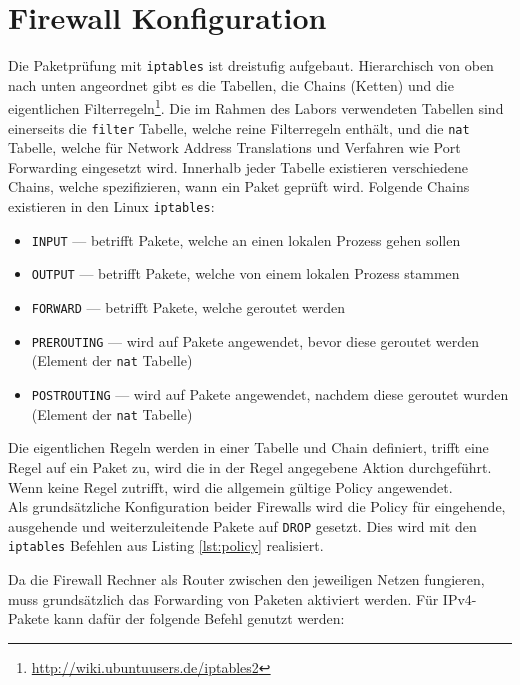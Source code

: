\section{Firewall Konfiguration}

Die Paketprüfung mit {\tt iptables} ist dreistufig aufgebaut.
Hierarchisch von oben nach unten angeordnet gibt es die Tabellen, die Chains
(Ketten) und die eigentlichen Filterregeln\footnote{
\url{http://wiki.ubuntuusers.de/iptables2}
}.
Die im Rahmen des Labors verwendeten Tabellen sind einerseits die {\tt filter}
Tabelle, welche reine Filterregeln enthält, und die {\tt nat} Tabelle, welche
für Network Address Translations und Verfahren wie Port Forwarding eingesetzt
wird.
Innerhalb jeder Tabelle existieren verschiedene Chains, welche spezifizieren,
wann ein Paket geprüft wird.
Folgende Chains existieren in den Linux {\tt iptables}:

\begin{itemize}
\item {\tt INPUT} --- betrifft Pakete, welche an einen lokalen Prozess gehen
      sollen
\item {\tt OUTPUT} --- betrifft Pakete, welche von einem lokalen Prozess stammen
\item {\tt FORWARD} --- betrifft Pakete, welche geroutet werden
\item {\tt PREROUTING} --- wird auf Pakete angewendet, bevor diese geroutet
      werden (Element der {\tt nat} Tabelle)
\item {\tt POSTROUTING} --- wird auf Pakete angewendet, nachdem diese geroutet
      wurden (Element der {\tt nat} Tabelle)
\end{itemize}

\noindent Die eigentlichen Regeln werden in einer Tabelle und Chain definiert,
trifft eine Regel auf ein Paket zu, wird die in der Regel angegebene Aktion
durchgeführt.
Wenn keine Regel zutrifft, wird die allgemein gültige Policy angewendet.
\\

\noindent Als grundsätzliche Konfiguration beider Firewalls wird die Policy für
eingehende, ausgehende und weiterzuleitende Pakete auf {\tt DROP} gesetzt.
Dies wird mit den {\tt iptables} Befehlen aus Listing \ref{lst:policy}
realisiert.



\noindent Da die Firewall Rechner als Router zwischen den jeweiligen Netzen
fungieren, muss grundsätzlich das Forwarding von Paketen aktiviert werden.
Für IPv4-Pakete kann dafür der folgende Befehl genutzt werden:

